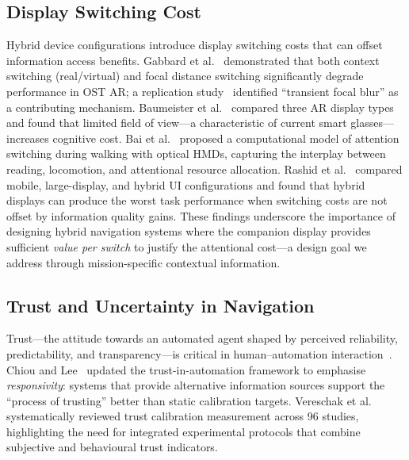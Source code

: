 \documentclass[review]{vgtc}           %
\begin{document}
\subsection{Display Switching Cost}

Hybrid device configurations introduce display switching costs that
can offset information access benefits. Gabbard et
al.~\cite{Gabbard:2018:EAR} demonstrated that both context switching
(real/virtual) and focal distance switching significantly degrade
performance in OST AR; a replication study~\cite{Gabbard:2020:IAR}
identified ``transient focal blur'' as a contributing mechanism.
Baumeister et al.~\cite{Baumeister:2017:CCU} compared three AR
display types and found that limited field of view---a characteristic
of current smart glasses---increases cognitive cost. Bai et
al.~\cite{Bai:2024:HUM} proposed a computational model of attention
switching during walking with optical HMDs, capturing the interplay
between reading, locomotion, and attentional resource allocation.
Rashid et al.~\cite{Rashid:2012:CDS} compared mobile, large-display,
and hybrid UI configurations and found that hybrid displays can
produce the worst task performance when switching costs are not offset
by information quality gains. These findings underscore the
importance of designing hybrid navigation systems where the companion
display provides sufficient \emph{value per switch} to justify the
attentional cost---a design goal we address through mission-specific
contextual information.

\subsection{Trust and Uncertainty in Navigation}

Trust---the attitude towards an automated agent shaped by perceived
reliability, predictability, and transparency---is critical in human--automation
interaction~\cite{Lee:2004:TAS}. Chiou and Lee~\cite{Chiou:2023:TAD}
updated the trust-in-automation framework to emphasise
\emph{responsivity}: systems that provide alternative information
sources support the ``process of trusting'' better than static
calibration targets. Vereschak et al.~\cite{Vereschak:2023:MUT}
systematically reviewed trust calibration measurement across 96
studies, highlighting the need for integrated experimental protocols
that combine subjective and behavioural trust indicators.
\end{document}
